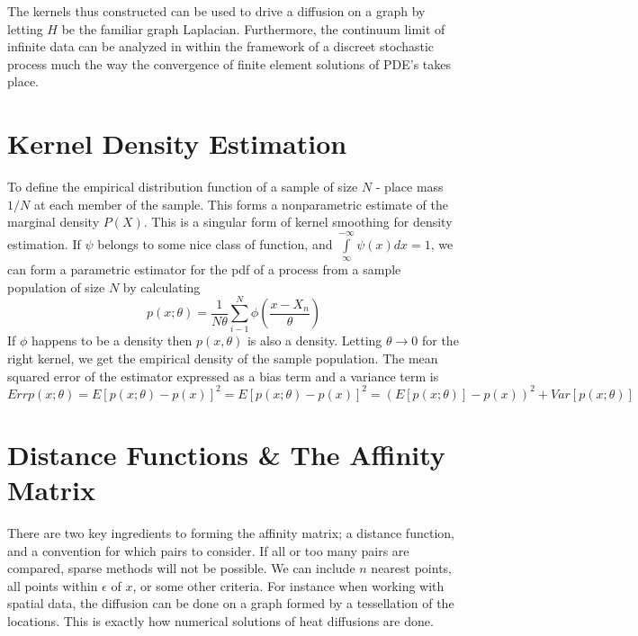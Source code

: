 The kernels thus  constructed can be used to drive a diffusion on a graph by letting $H$ be the familiar graph Laplacian.  Furthermore, the continuum limit of infinite data can be analyzed in within the framework of a discreet stochastic process much the way the convergence of finite element solutions of PDE's takes place.


\section{Kernel Density Estimation}
To define the empirical distribution function of a sample of size $N$ - place mass $1/N$ at each member of the sample.  This forms a nonparametric estimate of the marginal density $P(X)$.  This is a singular form of kernel smoothing for density estimation.  If $\psi$ belongs to some nice class of function, and $\int\limits_{\infty}^{-\infty}\psi(x) dx = 1$, we can form a parametric estimator for the pdf of a process from a sample
population of size $N$ by calculating
\begin{equation} p(x;\theta)=\frac{1}{N \theta}
\sum\limits_{i-1}^{N} \phi( \frac{x-X_n}{\theta})
\end{equation}  If $\phi$ happens to be a density then $p(x,
\theta)$ is also a density.  Letting $\theta \rightarrow 0$ for
the right kernel, we get the empirical density of the sample
population.  The mean squared error of the estimator expressed
as a bias term and a variance term is \begin{equation} Err
p(x;\theta)= E[p(x;\theta)-p(x)]^2 =  E[ p(x;\theta)-p(x)]^2 =
(E[p(x;\theta)]-p(x))^2 + Var[ p(x;\theta)]
\end{equation}


\section{Distance Functions \& The Affinity Matrix}

There are two key ingredients to forming the affinity matrix; a distance function, and a convention for which pairs to consider.  If all or too many pairs are compared, sparse methods will not be possible.  We can include $n$ nearest points, all points within $\epsilon$ of $x$, or some other criteria. For instance when working with spatial data, the diffusion can be done on a graph formed by a tessellation of the locations.  This is exactly how numerical solutions of heat diffusions are done.

